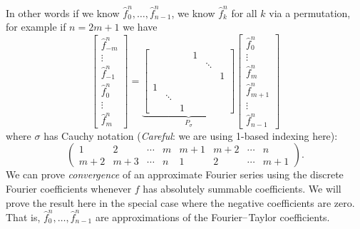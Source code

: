 In other words if we know $\hat f_0^n, \ensuremath{\ldots}, \hat f_{n-1}^n$, we know $\hat f_k^n$ for all $k$ via a permutation, for example if $n = 2m+1$ we have
\[
\begin{bmatrix}
\hat f_{-m}^n \\
\ensuremath{\vdots}\\
\hat f_{-1}^n \\
\hat f_0^n \\
\ensuremath{\vdots}\\
\hat f_m^n
\end{bmatrix} = \underbrace{\begin{bmatrix} &&& 1 \\ &&&& \ensuremath{\ddots} \\ &&&&& 1 \\
    1 \\ & \ensuremath{\ddots} \\ && 1 \end{bmatrix}}_{P_\ensuremath{\sigma}}
\begin{bmatrix}
\hat f_0^n \\
\ensuremath{\vdots}\\
\hat f_m^n\\
\hat f_{m+1}^n \\
\ensuremath{\vdots}\\
\hat f_{n-1}^n
\end{bmatrix}
\]
where $\ensuremath{\sigma}$ has Cauchy notation (\emph{Careful}: we are using 1-based indexing here):
\[
\begin{pmatrix}
1 & 2 & \ensuremath{\cdots} & m & m+1 & m+2 & \ensuremath{\cdots} & n  \\
m+2 & m+3 & \ensuremath{\cdots} & n & 1 & 2 & \ensuremath{\cdots} & m+1
\end{pmatrix}.
\]
We can  prove \emph{convergence} of an approximate Fourier series using the discrete Fourier coefficients  whenever $f$ has absolutely summable coefficients. We will prove the result here in the special case where the negative coefficients are zero. That is, $\hat f_0^n, \ensuremath{\ldots}, \hat f_{n-1}^n$ are approximations of the Fourier\ensuremath{\endash}Taylor coefficients.

